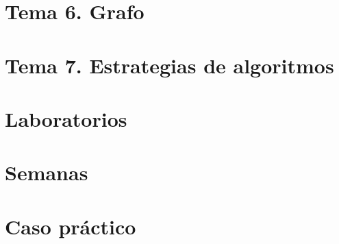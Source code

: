 \documentclass[12pt, twoside, openright]{report} %
\begin{document}
\part{Tema 6. Grafo}


\part{Tema 7. Estrategias de algoritmos}



\part{Laboratorios}









\part{Semanas}




\part{Caso práctico}


\end{document}

